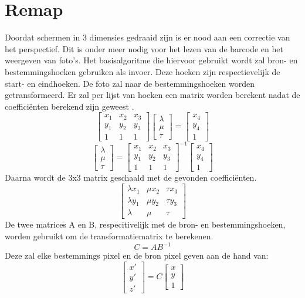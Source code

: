 \section{Remap}
Doordat schermen in 3 dimensies gedraaid zijn is er nood aan een correctie van het perspectief. Dit is onder meer nodig voor het lezen van de barcode en het weergeven van foto's. Het basisalgoritme die hiervoor gebruikt wordt zal bron- en bestemmingshoeken gebruiken als invoer. Deze hoeken zijn respectievelijk de start- en eindhoeken. De foto zal naar de bestemmingshoeken worden getransformeerd. Er zal per lijst van hoeken een matrix worden berekent nadat de coefficiënten berekend zijn geweest .
$$ \begin{bmatrix}
x_1 & x_2 & x_3 \\ y_1 & y_2 & y_3 \\ 1 & 1 & 1
\end{bmatrix} \begin{bmatrix}
\lambda \\ \mu \\ \tau
\end{bmatrix} =
\begin{bmatrix}
x_4 \\ y_4 \\ 1
\end{bmatrix}
$$
$$ \begin{bmatrix}
\lambda \\ \mu \\ \tau
\end{bmatrix} =\begin{bmatrix}
x_1 & x_2 & x_3 \\ y_1 & y_2 & y_3 \\ 1 & 1 & 1
\end{bmatrix}^{-1}
\begin{bmatrix}
x_4 \\ y_4 \\ 1
\end{bmatrix}
$$
Daarna wordt de 3x3 matrix geschaald met de gevonden coefficiënten.
$$
\begin{bmatrix}
\lambda x_1 & \mu x_2 & \tau x_3 \\ \lambda y_1 & \mu y_2 & \tau y_3 \\ \lambda & \mu & \tau
\end{bmatrix}
$$
De twee matrices A en B, respecitivelijk met de bron- en bestemmingshoeken, worden gebruikt om de transformatiematrix te berekenen.
$$ C = AB^{-1}$$
Deze zal elke bestemmings pixel en de bron pixel geven aan de hand van:
$$
\begin{bmatrix}
x' \\ y' \\ z'
\end{bmatrix} = C\begin{bmatrix}
x \\ y \\ 1
\end{bmatrix}
$$
